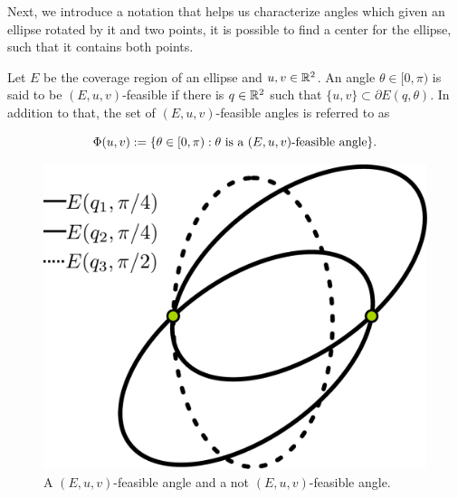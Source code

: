 

Next, we introduce a notation that helps us characterize angles which given an ellipse rotated by it and two points, it is possible to find a center for the ellipse, such that it contains both points.

\begin{definition}\label{def:feasible_angle}
	Let $E$ be the coverage region of an ellipse and $u, v \in \mathbb{R}^2$. An angle $\theta \in [0, \pi)$ is said to be $(E, u, v)$-feasible if there is $q \in \mathbb{R}^2$ such that $\{u, v\} \subset \partial E(q, \theta)$.
	In addition to that, the set of $(E, u, v)$-feasible angles is referred to as 
	
	\begin{equation}
	\Phi(u, v) := \{\theta \in [0, \pi) : \theta \textnormal{ is a } (E,u,v)\textnormal{-feasible angle}\}.
	\end{equation}
\end{definition}

\begin{figure}[H]
	\centering
	\includegraphics[scale=.22]{figures/feasible-angle2}
	\caption{A $(E, u, v)$-feasible angle and a not $(E, u, v)$-feasible angle.}
	\label{fig:feasible-angle}
\end{figure}


